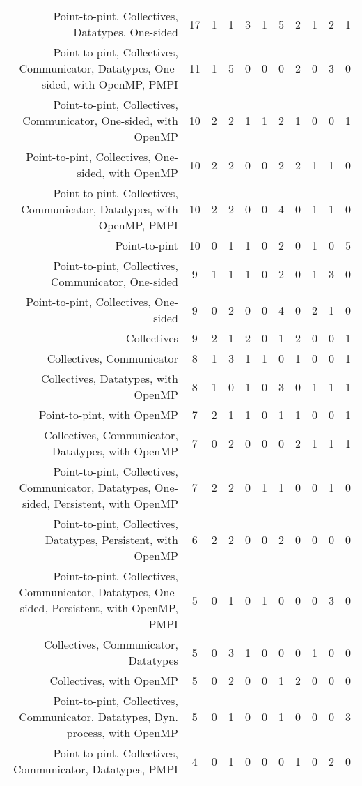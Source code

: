 {\begin{landscape}
\begin{longtable}[htb]{r|c|c|c|c|c|c|c|c|c|c}
{Point-to-pint, Collectives, Datatypes, One-sided} & 17 & 1 & 1 & 3 & 1 & 5 & 2 & 1 & 2 & 1 \\%
{Point-to-pint, Collectives, Communicator, Datatypes, One-sided, with OpenMP, PMPI} & 11 & 1 & 5 & 0 & 0 & 0 & 2 & 0 & 3 & 0 \\%
{Point-to-pint, Collectives, Communicator, One-sided, with OpenMP} & 10 & 2 & 2 & 1 & 1 & 2 & 1 & 0 & 0 & 1 \\%
{Point-to-pint, Collectives, One-sided, with OpenMP} & 10 & 2 & 2 & 0 & 0 & 2 & 2 & 1 & 1 & 0 \\%
{Point-to-pint, Collectives, Communicator, Datatypes, with OpenMP, PMPI} & 10 & 2 & 2 & 0 & 0 & 4 & 0 & 1 & 1 & 0 \\%
{Point-to-pint} & 10 & 0 & 1 & 1 & 0 & 2 & 0 & 1 & 0 & 5 \\%
{Point-to-pint, Collectives, Communicator, One-sided} & 9 & 1 & 1 & 1 & 0 & 2 & 0 & 1 & 3 & 0 \\%
{Point-to-pint, Collectives, One-sided} & 9 & 0 & 2 & 0 & 0 & 4 & 0 & 2 & 1 & 0 \\%
{Collectives} & 9 & 2 & 1 & 2 & 0 & 1 & 2 & 0 & 0 & 1 \\%
{Collectives, Communicator} & 8 & 1 & 3 & 1 & 1 & 0 & 1 & 0 & 0 & 1 \\%
{Collectives, Datatypes, with OpenMP} & 8 & 1 & 0 & 1 & 0 & 3 & 0 & 1 & 1 & 1 \\%
{Point-to-pint, with OpenMP} & 7 & 2 & 1 & 1 & 0 & 1 & 1 & 0 & 0 & 1 \\%
{Collectives, Communicator, Datatypes, with OpenMP} & 7 & 0 & 2 & 0 & 0 & 0 & 2 & 1 & 1 & 1 \\%
{Point-to-pint, Collectives, Communicator, Datatypes, One-sided, Persistent, with OpenMP} & 7 & 2 & 2 & 0 & 1 & 1 & 0 & 0 & 1 & 0 \\%
{Point-to-pint, Collectives, Datatypes, Persistent, with OpenMP} & 6 & 2 & 2 & 0 & 0 & 2 & 0 & 0 & 0 & 0 \\%
{Point-to-pint, Collectives, Communicator, Datatypes, One-sided, Persistent, with OpenMP, PMPI} & 5 & 0 & 1 & 0 & 1 & 0 & 0 & 0 & 3 & 0 \\%
{Collectives, Communicator, Datatypes} & 5 & 0 & 3 & 1 & 0 & 0 & 0 & 1 & 0 & 0 \\%
{Collectives, with OpenMP} & 5 & 0 & 2 & 0 & 0 & 1 & 2 & 0 & 0 & 0 \\%
{Point-to-pint, Collectives, Communicator, Datatypes, Dyn. process, with OpenMP} & 5 & 0 & 1 & 0 & 0 & 1 & 0 & 0 & 0 & 3 \\%
{Point-to-pint, Collectives, Communicator, Datatypes, PMPI} & 4 & 0 & 1 & 0 & 0 & 0 & 1 & 0 & 2 & 0 \\%

\end{longtable}
\end{landscape}}
